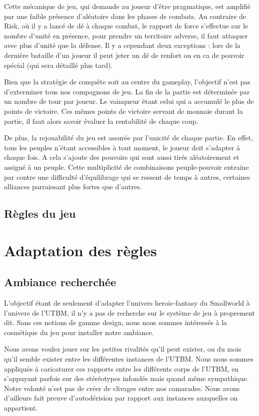 \documentclass[11pt]{report}
\begin{document}
		Cette mécanique de jeu, qui demande au joueur d'être pragmatique, est amplifié par une faible présence d'aléatoire dans les phases de combats. Au contraire de Risk\up{\copyright}, où il y a lancé de dé à chaque combat, le rapport de force s'effectue sur le nombre d'unité en présence, pour prendre un territoire adverse, il faut attaquer avec plus d'unité que la défense. Il y a cependant deux exceptions : lors de la dernière bataille d'un joueur il peut jeter un dé de renfort ou en ca de pouvoir spécial (qui sera détaillé plus tard).
		
		Bien que la stratégie de conquête soit au centre du gameplay, l'objectif n'est pas d'exterminer tous nos compagnons de jeu. La fin de la partie est déterminée par un nombre de tour par joueur. Le vainqueur étant celui qui a accumulé le plus de points de victoire. Ces mêmes points de victoire servant de monnaie durant la partie, il faut alors savoir évaluer la rentabilité de chaque coup. 
		
		De plus, la rejouabilité du jeu est assurée par l'unicité de chaque partie. En effet, tous les peuples n'étant accessibles à tout moment, le joueur doit s'adapter à chaque fois. A cela s'ajoute des pouvoirs qui sont aussi tirés aléatoirement et assigné à un peuple. Cette multiplicité de combinaisons peuple-pouvoir entraine par contre une difficulté d'équilibrage qui se ressent de temps à autres, certaines alliances parraissant plus fortes que d'autres.
	\section{Règles du jeu}

\chapter{Adaptation des règles}

	\section{Ambiance recherchée}
	
	L'objectif étant de seulement d'adapter l'univers heroic-fantasy du Smallworld\up{\copyright} à l'univers de l'UTBM, il n'y a pas de recherche sur le système de jeu à proprement dit. Sans ces notions de gamme design, nous nous sommes intéressés à la cosmétique du jeu pour installer notre ambiance. 
	
	Nous avons voulez jouer sur les petites rivalités qu'il peut exister, ou du mois qu'il semble exister entre les différentes instances de l'UTBM. Nous nous sommes appliqués à caricaturer ces rapports entre les différents corps de l'UTBM, en s'appuyant parfois sur des stéréotypes infondés mais quand même sympathique. Notre volonté n'est pas de créer de clivages entre nos camarades. Nous avons d'ailleurs fait preuve d'autodérision par rapport aux instances auxquelles on appartient. 
	
\end{document}
